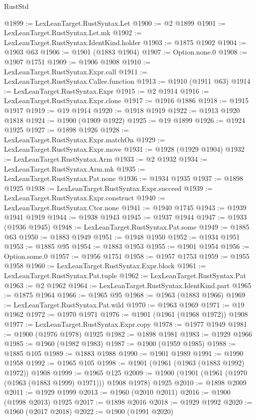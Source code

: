 \begin{lexlean}{RustStd}
\begin{coremodule}
@1899 := LexLeanTarget.RustSyntax.Let
@1900 := @2 @1899
@1901 := LexLeanTarget.RustSyntax.Let.mk
@1902 := LexLeanTarget.RustSyntax.IdentKind.holder
@1903 := @1875 @1902
@1904 := @1903 @63
@1906 := @1901 (@1883 @1904)
@1907 := Option.none.{0}
@1908 := @1907 @1751
@1909 := @1906 @1908
@1910 := LexLeanTarget.RustSyntax.Expr.call
@1911 := LexLeanTarget.RustSyntax.Callee.function
@1913 := @1910 (@1911 @63)
@1914 := LexLeanTarget.RustSyntax.Expr
@1915 := @2 @1914
@1916 := LexLeanTarget.RustSyntax.Expr.clone
@1917 := @1916 @1886
@1918 := @1915 @1917
@1919 := @19 @1914
@1920 := @1918 @1919
@1922 := @1913 @1920 @1818
@1924 := @1900 (@1909 @1922)
@1925 := @19 @1899
@1926 := @1924 @1925
@1927 := @1898 @1926
@1928 := LexLeanTarget.RustSyntax.Expr.matchOn
@1929 := LexLeanTarget.RustSyntax.Expr.move
@1931 := @1928 (@1929 @1904)
@1932 := LexLeanTarget.RustSyntax.Arm
@1933 := @2 @1932
@1934 := LexLeanTarget.RustSyntax.Arm.mk
@1935 := LexLeanTarget.RustSyntax.Pat.none
@1936 := @1934 @1935
@1937 := @1898 @1925
@1938 := LexLeanTarget.RustSyntax.Expr.succeed
@1939 := LexLeanTarget.RustSyntax.Expr.construct
@1940 := LexLeanTarget.RustSyntax.Ctor.none
@1941 := @1940 @1745
@1943 := @1939 @1941 @1919
@1944 := @1938 @1943
@1945 := @1937 @1944
@1947 := @1933 (@1936 @1945)
@1948 := LexLeanTarget.RustSyntax.Pat.some
@1949 := @1885 @63
@1950 := @1883 @1949
@1951 := @1948 @1950
@1952 := @1934 @1951
@1953 := @1885 @95
@1954 := @1883 @1953
@1955 := @1901 @1954
@1956 := Option.some.{0}
@1957 := @1956 @1751
@1958 := @1957 @1753
@1959 := @1955 @1958
@1960 := LexLeanTarget.RustSyntax.Expr.block
@1961 := LexLeanTarget.RustSyntax.Pat.tuple
@1962 := LexLeanTarget.RustSyntax.Pat
@1963 := @2 @1962
@1964 := LexLeanTarget.RustSyntax.IdentKind.part
@1965 := @1875 @1964
@1966 := @1965 @95
@1968 := @1963 (@1883 @1966)
@1969 := LexLeanTarget.RustSyntax.Pat.wild
@1970 := @1963 @1969
@1971 := @19 @1962
@1972 := @1970 @1971
@1976 := @1901 (@1961 (@1968 @1972)) @1908
@1977 := LexLeanTarget.RustSyntax.Expr.copy
@1978 := @1977 @1949
@1981 := @1900 (@1976 @1978) @1925
@1982 := @1898 @1981
@1983 := @1929 @1966
@1985 := @1960 (@1982 @1983)
@1987 := @1900 (@1959 @1985)
@1988 := @1885 @105
@1989 := @1883 @1988
@1990 := @1901 @1989
@1991 := @1990 @1958
@1992 := @1965 @105
@1998 := @1901 (@1961 (@1963 (@1883 @1992) @1972)) @1908
@1999 := @1965 @125
@2009 := @1900 (@1901 (@1961 (@1970 (@1963 (@1883 @1999) @1971))) @1908 @1978) @1925
@2010 := @1898 @2009
@2011 := @1929 @1999
@2013 := @1960 (@2010 @2011)
@2016 := @1900 (@1998 @2013) @1925
@2017 := @1898 @2016
@2018 := @1929 @1992
@2020 := @1960 (@2017 @2018)
@2022 := @1900 (@1991 @2020)

\end{coremodule}
\end{lexlean}
